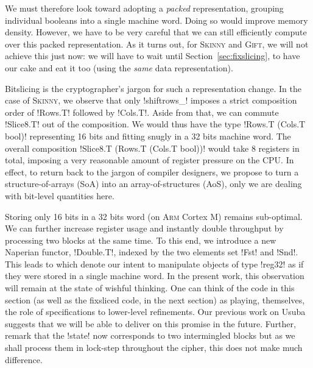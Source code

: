 \documentclass[draft,english]{jflart}
\newcommand{\Skinny}{\textsc{Skinny}}
\newcommand{\Gift}{\textsc{Gift}}
\begin{document}

We must therefore look toward adopting a \emph{packed} representation,
grouping individual booleans into a single machine word. Doing so
would improve memory density. However, we have to be very careful that
we can still efficiently compute over this packed representation. As
it turns out, for \Skinny{} and \Gift{}, we will not achieve this just
now: we will have to wait until Section~\ref{sec:fixslicing}, to have
our cake and eat it too (using the \emph{same} data representation).


Bitslicing is the cryptographer's jargon for such a representation
change. In the case of \Skinny{}, we observe that only \coqe!shiftrows_!
imposes a strict composition order of \coqe!Rows.T! followed by
\coqe!Cols.T!. Aside from that, we can commute \coqe!Slice8.T! out of the
composition. We would thus have the type \coqe!Rows.T (Cols.T bool)!
representing 16 bits and fitting snugly in a 32 bits machine word. The
overall composition \coqe!Slice8.T (Rows.T (Cols.T bool))! would take
8 registers in total, imposing a very reasonable amount of register
pressure on the CPU.
%
In effect, to return back to the jargon of compiler designers, we
propose to turn a structure-of-arrays (SoA) into an
array-of-structures (AoS), only we are dealing with bit-level
quantities here.



Storing only 16 bits in a 32 bits word (on \textsc{Arm} Cortex M)
remains sub-optimal. We can further increase register usage and
instantly double throughput by processing two blocks at the same
time. To this end, we introduce a new Naperian functor,
\coqe!Double.T!, indexed by the two elements set \coqe!Fst!  and
\coqe!Snd!. This leads to
%
%
which denote our intent to manipulate objects of type \coqe!reg32! as
if they were stored in a single machine word. In the present work,
this observation will remain at the state of wishful thinking. One can
think of the code in this section (as well as the fixsliced code, in
the next section) as playing, themselves, the role of specifications
to lower-level refinements. Our previous work on Usuba suggests that
we will be able to deliver on this promise in the future. Further,
remark that the \coqe!state! now corresponds to two intermingled
blocks but as we shall process them in lock-step throughout the
cipher, this does not make much difference.
\end{document}
